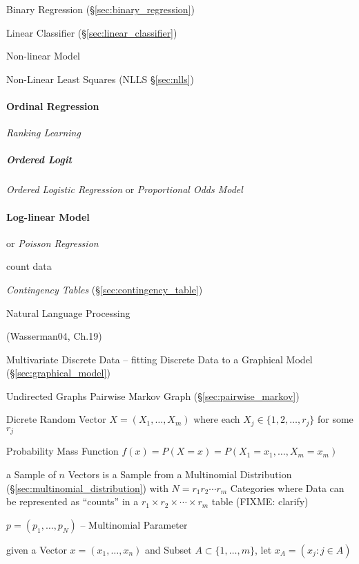 Binary Regression (\S\ref{sec:binary_regression})

Linear Classifier (\S\ref{sec:linear_classifier})

Non-linear Model

Non-Linear Least Squares (NLLS \S\ref{sec:nlls})



\paragraph{Ordinal Regression}\label{sec:ordinal_regression}\hfill

\emph{Ranking Learning}



\subparagraph{Ordered Logit}\label{sec:ordered_logit}\hfill

\emph{Ordered Logistic Regression} or \emph{Proportional Odds Model}



\paragraph{Log-linear Model}\label{sec:log_linear}\hfill

or \emph{Poisson Regression}

count data

\emph{Contingency Tables} (\S\ref{sec:contingency_table})

Natural Language Processing

(Wasserman04, Ch.19)

Multivariate Discrete Data --
fitting Discrete Data to a Graphical Model (\S\ref{sec:graphical_model})

Undirected Graphs \fist Pairwise Markov Graph (\S\ref{sec:pairwise_markov})

Dicrete Random Vector $X = (X_1, \ldots, X_m)$ where each
$X_j \in \{ 1, 2, \ldots, r_j \}$ for some $r_j$

Probability Mass Function $f(x) = P(X = x) = P(X_1 = x_1, \ldots, X_m = x_m)$

a Sample of $n$ Vectors is a Sample from a Multinomial Distribution
(\S\ref{sec:multinomial_distribution}) with $N = r_1 r_2 \cdots r_m$ Categories
where Data can be represented as ``counts'' in a
$r_1 \times r_2 \times \cdots \times r_m$ table (FIXME: clarify)

$p = (p_1, \ldots, p_N)$ -- Multinomial Parameter

given a Vector $x = (x_1, \ldots, x_n)$ and Subset
$A \subset \{ 1, \ldots, m \}$, let $x_A = (x_j : j \in A)$

